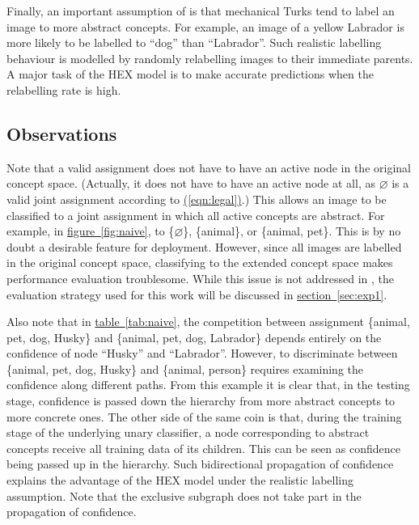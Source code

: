 \documentclass[11pt,a4paper]{article}
\begin{document}
Finally, an important assumption of \cite{deng2014large} is that mechanical Turks tend to label an image to more abstract concepts. For example, an image of a yellow Labrador is more likely to be labelled to ``dog'' than ``Labrador''. Such realistic labelling behaviour is modelled by randomly relabelling images to their immediate parents. A major task of the HEX model is to make accurate predictions when the relabelling rate is high.

\subsection{Observations}
\label{sec:observ}

Note that a valid assignment does not have to have an active node in the original concept space. (Actually, it does not have to have an active node at all, as $\varnothing$ is a valid joint assignment according to \hyperref[eqn:legal]{(\ref{eqn:legal})}.) This allows an image to be classified to a joint assignment in which all active concepts are abstract. For example, in \hyperref[fig:naive]{figure~\ref{fig:naive}}, to \{$\varnothing$\}, \{animal\}, or \{animal, pet\}. This is by no doubt a desirable feature for deployment. However, since all images are labelled in the original concept space, classifying to the extended concept space makes performance evaluation troublesome. While this issue is not addressed in \cite{deng2014large}, the evaluation strategy used for this work will be discussed in \hyperref[sec:exp1]{section~\ref{sec:exp1}}.

Also note that in \hyperref[tab:naive]{table~\ref{tab:naive}}, the competition between assignment \{animal, pet, dog, Husky\} and \{animal, pet, dog, Labrador\} depends entirely on the confidence of node ``Husky'' and ``Labrador''. However, to discriminate between \{animal, pet, dog, Husky\} and \{animal, person\} requires examining the confidence along different paths. From this example it is clear that, in the testing stage, confidence is passed down the hierarchy from more abstract concepts to more concrete ones. The other side of the same coin is that, during the training stage of the underlying unary classifier, a node corresponding to abstract concepts receive all training data of its children. This can be seen as confidence being passed up in the hierarchy. Such bidirectional propagation of confidence explains the advantage of the HEX model under the realistic labelling assumption. Note that the exclusive subgraph does not take part in the propagation of confidence.
\end{document}
